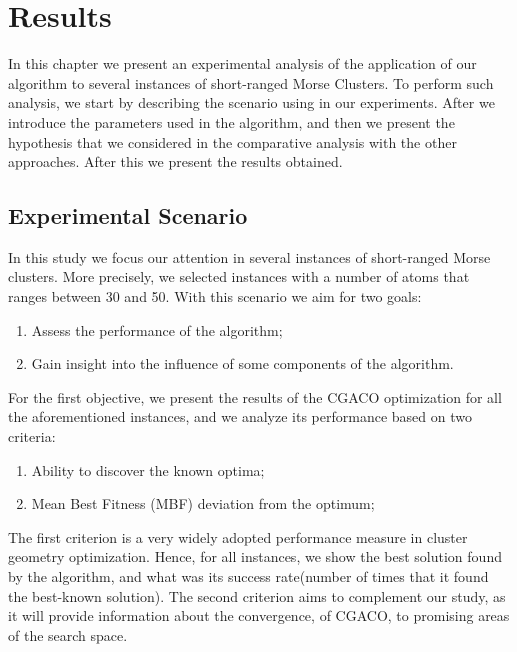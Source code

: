 \chapter{Results}

In this chapter we present an experimental analysis of the application of our algorithm to several instances of short-ranged Morse Clusters. To perform such analysis, we start by describing the scenario using in our experiments. After we introduce the parameters used in the algorithm, and then we present the hypothesis that we considered in the comparative analysis with the other approaches. After this we present the results obtained.




\section{Experimental Scenario}
\label{sec:experimental_scenario}
In this study we focus our attention in several instances of short-ranged Morse clusters. More precisely, we selected instances with a number of atoms that ranges between 30 and 50. With this scenario we aim for two goals: 
	\begin{enumerate}
		\item Assess the performance of the algorithm;
		\item Gain insight into the influence of some components of the algorithm. 
	\end{enumerate}
	
	For the first objective, we present the results of the CGACO optimization for all the aforementioned instances, and we analyze its performance based on two criteria:
	\begin{enumerate}
		\item Ability to discover the known optima;
		\item Mean Best Fitness (MBF) deviation from the optimum;
	\end{enumerate}
	
	The first criterion is a very widely adopted performance measure in cluster geometry optimization. Hence, for all instances, we show the best solution found by the algorithm, and what was its success rate(number of times that it found the best-known solution).
	The second criterion aims to complement our study, as it will provide information about the convergence, of CGACO, to promising areas of the search space.
	
